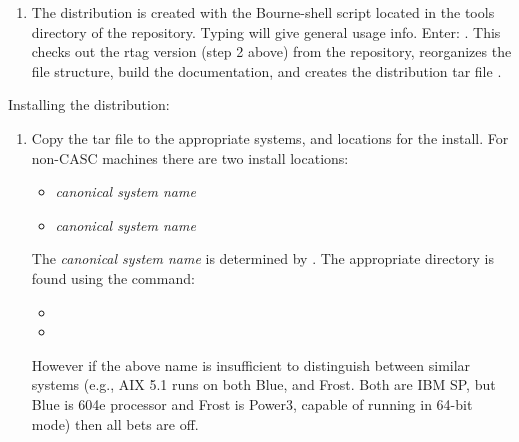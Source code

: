 \begin{enumerate}
   \item The distribution is created with the  
   Bourne-shell script located in the tools directory of the 
   \hypre{} repository.  Typing  will give 
   general usage info. Enter: . This checks 
   out the rtag version (step 2 above) from the repository,
   reorganizes the file structure, build the documentation,
   and creates the distribution tar file .

\end{enumerate}

Installing the \hypre{} distribution:

\begin{enumerate}

   \item Copy the tar file  to the 
   appropriate systems, and locations for the install. For non-CASC 
   machines there are two install locations:
      \begin{itemize}
       \item {}\textit{canonical system name}
       \item {}\textit{canonical system name}
      \end{itemize}
   The \textit{canonical system name} is determined by 
   . The appropriate directory is found using
   the command:
      \begin{itemize}
       \item {}
       \item {}
      \end{itemize}
   However if the above name is insufficient to distinguish between
   similar systems (e.g., AIX 5.1 runs on both Blue, and Frost. Both
   are IBM SP, but Blue is 604e processor and Frost is Power3, capable
   of running in 64-bit mode) then all bets are off. 
   

\end{enumerate}
